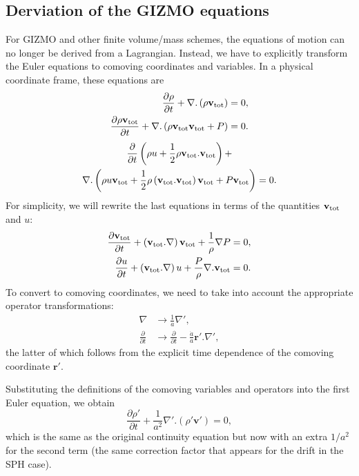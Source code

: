 \subsection{Derviation of the GIZMO equations}

For GIZMO and other finite volume/mass schemes, the equations of motion can no
longer be derived from a Lagrangian. Instead, we have to explicitly transform
the Euler equations to comoving coordinates and variables. In a physical
coordinate frame, these equations are
\begin{align}
\frac{\partial{}\rho{}}{\partial{}t} +
\nabla{} . \left(\rho{} \mathbf{v}_{\rm tot} \right)
&= 0, \\
\frac{\partial{} \rho{} \mathbf{v}_{\rm tot} }{\partial{} t} +
\nabla{} . \left( \rho{} \mathbf{v}_{\rm tot} \mathbf{v}_{\rm tot} +
P \right) &= 0.
\end{align}
\begin{multline}
\frac{\partial{}}{\partial{} t} \left( \rho{} u + \frac{1}{2} \rho{}
\mathbf{v}_{\rm{} tot}.\mathbf{v}_{\rm{} tot} \right) +\\
\nabla{} . \left( \rho{} u \mathbf{v}_{\rm{} tot} +
\frac{1}{2} \rho{} \left(\mathbf{v}_{\rm{} tot}. \mathbf{v}_{\rm{} tot}\right)
\mathbf{v}_{\rm{} tot} + P \mathbf{v}_{\rm{} tot} \right) = 0.
\end{multline}
For simplicity, we will rewrite the last equations in terms of the quantities
$\mathbf{v}_{\rm{} tot}$ and $u$:
\begin{align}
\frac{\partial{} \mathbf{v}_{\rm{} tot}}{\partial{} t} +
\left(\mathbf{v}_{\rm{} tot} . \nabla{} \right) \mathbf{v}_{\rm{} tot} +
\frac{1}{\rho{}}\nabla{} P &= 0,\\
\frac{\partial{} u}{\partial{} t} +
\left(\mathbf{v}_{\rm{} tot} . \nabla{} \right) u +
\frac{P}{\rho{}} \nabla{} . \mathbf{v}_{\rm{} tot} &= 0.
\end{align}
To convert to comoving coordinates, we need to take into account the
appropriate operator transformations:
\begin{align}
\nabla{} &\rightarrow{} \frac{1}{a} \nabla{}', \\
\frac{\partial{}}{\partial{} t} &\rightarrow{}
\frac{\partial{}}{\partial{} t} - \frac{\dot{a}}{a} \mathbf{r}' . \nabla{}',
\end{align}
the latter of which follows from the explicit time dependence of the comoving
coordinate $\mathbf{r}'$.

Substituting the definitions of the comoving variables and operators into
the first Euler equation, we obtain
\begin{equation}
\frac{\partial{} \rho{}'}{\partial{} t} + \frac{1}{a^2} \nabla{}' . \left(
\rho{}' \mathbf{v}' \right) = 0,
\end{equation}
which is the same as the original continuity equation but now with an extra
$1/a^2$ for the second term (the same correction factor that appears
for the drift in the SPH case).

